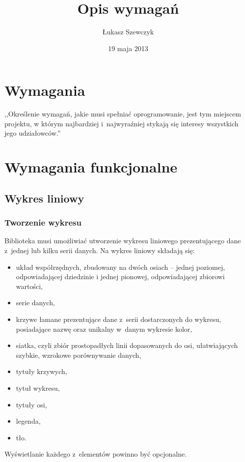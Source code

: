 \documentclass[11pt,twoside,a4paper,final]{article}
\begin{document}
\date{19 maja 2013}
\title{Opis wymagań}

\author{Łukasz Szewczyk}

\maketitle

\section{Wymagania}
,,Określenie wymagań, jakie musi spełniać oprogramowanie, jest tym miejscem projektu, w którym najbardziej i~najwyraźniej stykają się interesy wszystkich jego udziałowców.''~\cite{sacha-wymagania}

\section{Wymagania funkcjonalne}
\subsection{Wykres liniowy}
\subsubsection{Tworzenie wykresu}
Biblioteka musi umożliwiać utworzenie wykresu liniowego prezentującego dane z~jednej lub kilku serii danych. Na wykres liniowy składają się:
\begin{itemize}
\item{układ współrzędnych, zbudowany na dwóch osiach -- jednej poziomej, odpowiadającej dziedzinie i jednej pionowej, odpowiadającej zbiorowi wartości,}
\item{serie danych,}
\item{krzywe łamane prezentujące dane z~serii dostarczonych do wykresu, posiadające nazwę oraz unikalny w~danym wykresie kolor,}
\item{siatka, czyli zbiór prostopadłych linii dopasowanych do osi, ułatwiających szybkie, wzrokowe porównywanie danych,}
\item{tytuły krzywych,}
\item{tytuł wykresu,}
\item{tytuły osi,}
\item{legenda,}
\item{tło.}
\end{itemize}

Wyświetlanie każdego z~elementów powinno być opcjonalne. 
\end{document}
